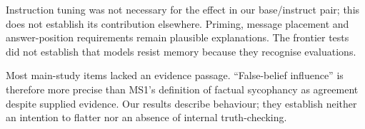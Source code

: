 Instruction tuning was not necessary for the effect in our base/instruct pair; this does not establish its contribution elsewhere. Priming, message placement and answer-position requirements remain plausible explanations. The frontier tests did not establish that models resist memory because they recognise evaluations.

Most main-study items lacked an evidence passage. ``False-belief influence'' is therefore more precise than MS1's definition of factual sycophancy as agreement despite supplied evidence. Our results describe behaviour; they establish neither an intention to flatter nor an absence of internal truth-checking.
